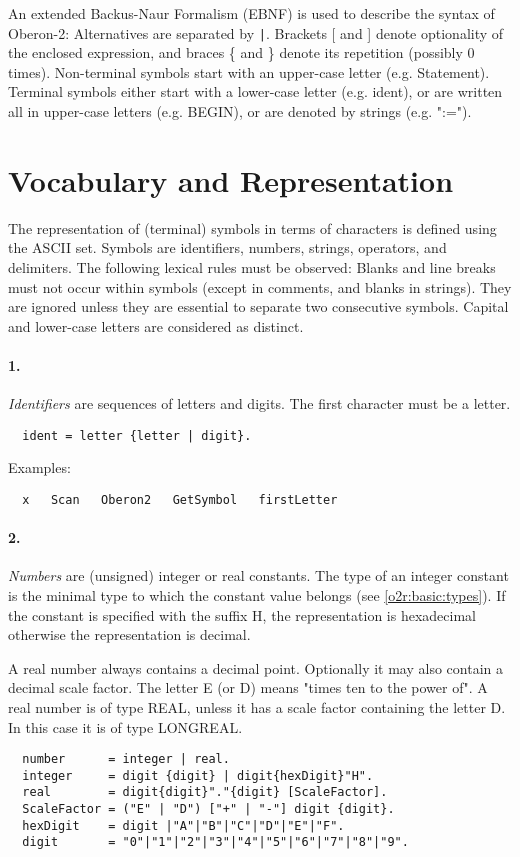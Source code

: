 An extended Backus-Naur Formalism (EBNF) is used to describe the syntax
of Oberon-2: Alternatives are separated by \verb+|+. Brackets [ and ] denote
optionality of the enclosed expression, and braces \{ and \} denote
its repetition (possibly 0 times). Non-terminal symbols start with
an upper-case letter (e.g. Statement). Terminal symbols either start
with a lower-case letter (e.g. ident), or are written all in upper-case
letters (e.g. BEGIN), or are denoted by strings (e.g. ":=").

\section{Vocabulary and Representation}

The representation of (terminal) symbols in terms of characters is
defined using the ASCII set. Symbols are identifiers, numbers, strings,
operators, and delimiters. The following lexical rules must be observed:
Blanks and line breaks must not occur within symbols (except in comments,
and blanks in strings). They are ignored unless they are essential
to separate two consecutive symbols. Capital and lower-case letters
are considered as distinct.

\paragraph{\rm 1.} {\em Identifiers} are sequences of letters and
digits. The first character must be a letter.
{\BNFsize
\begin{verbatim}
  ident = letter {letter | digit}.
\end{verbatim}}

\noindent
Examples:
\begin{verbatim}
  x   Scan   Oberon2   GetSymbol   firstLetter
\end{verbatim}

\paragraph{\rm 2.} {\em Numbers} are (unsigned) integer or real constants.
The type of an integer constant is the minimal type to which the constant
value belongs (see \ref{o2r:basic:types}). If the constant
is specified with the suffix H, the representation is hexadecimal
otherwise the representation is decimal.

A real number always contains
a decimal point. Optionally it may also contain a decimal scale factor.
The letter E (or D) means "times ten to the power of". A real number
is of type REAL, unless it has a scale factor containing the letter
D. In this case it is of type LONGREAL.
{\BNFsize
\begin{verbatim}
  number      = integer | real.
  integer     = digit {digit} | digit{hexDigit}"H".
  real        = digit{digit}"."{digit} [ScaleFactor].
  ScaleFactor = ("E" | "D") ["+" | "-"] digit {digit}.
  hexDigit    = digit |"A"|"B"|"C"|"D"|"E"|"F".
  digit       = "0"|"1"|"2"|"3"|"4"|"5"|"6"|"7"|"8"|"9".
\end{verbatim}}

